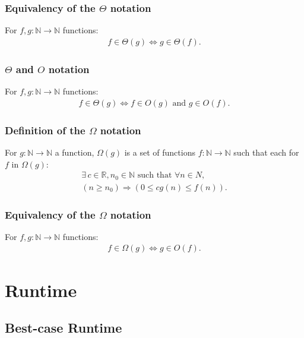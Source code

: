 \documentclass[a4paper, 12pt, twoside]{article}
\begin{document}
\subsubsection{Equivalency of the $\Theta$ notation}

For $f, g : \mathbb{N} \to \mathbb{N}$ functions:
\begin{gather*}
      f \in \Theta(g) \Longleftrightarrow g \in \Theta(f).
\end{gather*}

\subsubsection{$\Theta$ and $O$ notation}
For $f, g : \mathbb{N} \to \mathbb{N}$ functions:
\begin{gather*}
      f \in \Theta(g) \Longleftrightarrow f \in O(g) \text{ and }
      g \in O(f).
\end{gather*}

\subsubsection{Definition of the $\Omega$ notation}

For $g : \mathbb{N} \to \mathbb{N}$ a function, $\Omega(g)$ is a set of
functions $f : \mathbb{N} \to \mathbb{N}$ such that each for
$f$ in $\Omega(g)$:
\begin{gather*}
      \exists \, c \in \mathbb{R}, n_0 \in \mathbb{N}
      \text{ such that } \forall n \in N, \\
      (n \geq n_0) \Rightarrow (0 \leq cg(n) \leq f(n)).
\end{gather*}

\subsubsection{Equivalency of the $\Omega$ notation}

For $f, g : \mathbb{N} \to \mathbb{N}$ functions:
\begin{gather*}
      f \in \Omega(g) \Longleftrightarrow g \in O(f).
\end{gather*}

\newpage

\section{Runtime}

\subsection{Best-case Runtime}
\end{document}
